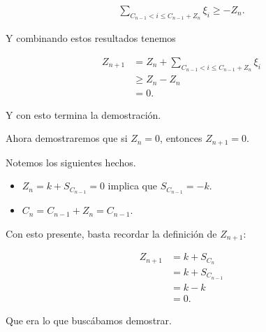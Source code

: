 \begin{itemize}
        \begin{align}
            \sum_{C_{n-1} < i \leq  C_{n-1} + Z_{n}} \xi_i \geq -Z_n.
        \end{align}
        
        Y combinando estos resultados tenemos
        
        \begin{align}
            Z_{n+1} &=      Z_n + \sum_{C_{n-1} < i \leq  C_{n-1} + Z_{n}} \xi_i    \\
                    &\geq   Z_n - Z_n                                               \\
                    &=      0.
        \end{align}
        
        Y con esto termina la demostración.
\end{itemize}

Ahora demostraremos que si $Z_n = 0$, entonces $Z_{n+1} = 0$.\pn

Notemos los siguientes hechos. 
\begin{itemize}
	\item 
        $Z_n = k + S_{C_{n-1}} = 0$ implica que $S_{C_{n-1}} = -k$.
    
    \item
        $C_n = C_{n-1} + Z_n = C_{n-1}$.
\end{itemize}

Con esto presente, basta recordar la definición de $Z_{n+1}$:

\begin{align}
    Z_{n+1} &=  k   +   S_{C_n}         \\
            &=  k   +   S_{C_{n-1}}     \\
            &=  k   -   k               \\
            &=  0.
\end{align}

Que era lo que buscábamos demostrar.